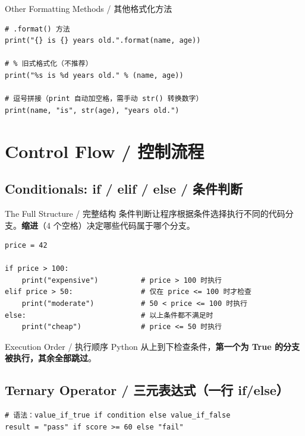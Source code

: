 \documentclass[11pt,a4paper]{report}
\begin{document}
\begin{concept}{Other Formatting Methods / 其他格式化方法}
\begin{lstlisting}
# .format() 方法
print("{} is {} years old.".format(name, age))

# % 旧式格式化（不推荐）
print("%s is %d years old." % (name, age))

# 逗号拼接（print 自动加空格，需手动 str() 转换数字）
print(name, "is", str(age), "years old.")
\end{lstlisting}
\end{concept}

\newpage

\chapter{Control Flow / 控制流程}

\section{Conditionals: if / elif / else / 条件判断}

\begin{concept}{The Full Structure / 完整结构}
条件判断让程序根据条件选择执行不同的代码分支。\textbf{缩进}（4 个空格）决定哪些代码属于哪个分支。
\begin{lstlisting}
price = 42

if price > 100:
    print("expensive")          # price > 100 时执行
elif price > 50:                # 仅在 price <= 100 时才检查
    print("moderate")           # 50 < price <= 100 时执行
else:                           # 以上条件都不满足时
    print("cheap")              # price <= 50 时执行
\end{lstlisting}
\end{concept}

\begin{warning}{Execution Order / 执行顺序}
Python 从上到下检查条件，\textbf{第一个为 True 的分支被执行，其余全部跳过}。
\end{warning}

\section{Ternary Operator / 三元表达式（一行 if/else）}

\begin{lstlisting}
# 语法：value_if_true if condition else value_if_false
result = "pass" if score >= 60 else "fail"
\end{lstlisting}
\end{document}
